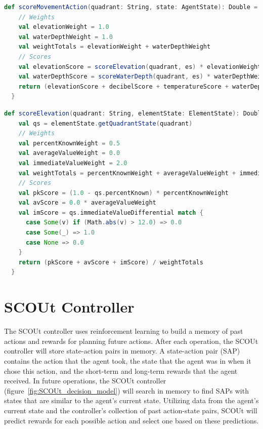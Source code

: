 \begin{lstlisting}[language=Scala, label=code:mapWater_scoreMovementAction]
  def scoreMovementAction(quadrant: String, state: AgentState): Double = {
    // Weights
    val elevationWeight = 1.0
    val waterDepthWeight = 1.0
    val weightTotals = elevationWeight + waterDepthWeight
    // Scores
    val elevationScore = scoreElevation(quadrant, es) * elevationWeight
    val waterDepthScore = scoreWaterDepth(quadrant, es) * waterDepthWeight
    return (elevationScore + decibelScore + temperatureScore + waterDepthScore) / weightTotals
  }
\end{lstlisting}

\begin{lstlisting}[language=Scala, label=code:findHuman_scoreElevation]
  def scoreElevation(quadrant: String, elementState: ElementState): Double = {
    val qs = elementState.getQuadrantState(quadrant)
    // Weights
    val percentKnownWeight = 0.5
    val averageValueWeight = 0.0
    val immediateValueWeight = 2.0
    val weightTotals = percentKnownWeight + averageValueWeight + immediateValueWeight
    // Scores
    val pkScore = (1.0 - qs.percentKnown) * percentKnownWeight
    val avScore = 0.0 * averageValueWeight
    val imScore = qs.immediateValueDifferential match {
      case Some(v) if (Math.abs(v) > 12.0) => 0.0
      case Some(_) => 1.0
      case None => 0.0
    }
    return (pkScore + avScore + imScore) / weightTotals
  }
\end{lstlisting}




\section{SCOUt Controller} \label{sec:scout_controller}
The SCOUt controller uses reinforcement learning to build a memory of past actions and rewards for planning future actions.
After each operation, the SCOUt controller will store state-action pairs in memory.
A state-action pair (SAP) contains the action that the agent took, the state that the agent was in when it chose this action, and the short-term and long-term rewards that the agent received.
In future operations, the SCOUt controller (figure~\ref{fig:SCOUt_decision_model}) will search in memory to find SAPs with states that are similar to the agent's current state.
Utilizing data from the agent's current state and the controller's collection of past action-state pairs, SCOUt will predict rewards for each possible action and select one based on these predictions.

